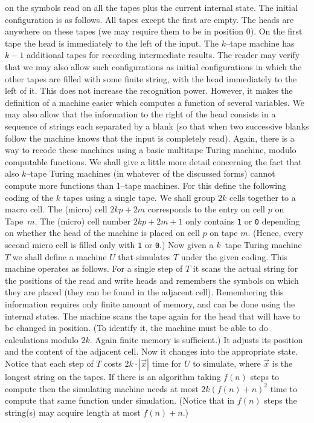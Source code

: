 on the symbols read on all the tapes plus the current internal
state. The initial configuration is as follows. All tapes
except the first are empty. The heads are anywhere on these
tapes (we may require them to be in position 0). On the first
tape the head is immediately to the left of the input.
The $k$--tape machine has $k-1$ additional tapes for
recording intermediate results. The reader may verify that we
may also allow such configurations as initial configurations
in which the other tapes are filled with some finite string,
with the head immediately to the left of it. This does not
increase the recognition power. However, it makes the definition
of a machine easier which computes a function of several 
variables. We may also allow that the information to the right of the
head consists in a sequence of strings each separated by
a blank (so that when two successive blanks follow the machine 
knows that the input is completely read). Again, there is a
way to recode these machines using a basic multitape Turing
machine, modulo computable functions. We shall give a little
more detail concerning the fact that also $k$--tape Turing
machines (in whatever of the discussed forms) cannot compute
more functions than 1--tape machines. For this define the
following coding of the $k$ tapes using a single tape.
We shall group $2k$ cells together to a macro cell.
The (micro) cell $2kp + 2m$ corresponds to the entry on
cell $p$ on Tape~$m$. The (micro) cell number $2kp + 2m +1$
only contains {\tt 1} or {\tt 0} depending on whether the head 
of the machine is placed on cell $p$ on tape $m$. (Hence, every 
second micro cell is filled only with {\tt 1} or {\tt 0}.)
Now given a $k$--tape Turing machine $T$ we shall define a
machine $U$ that simulates $T$ under the given coding.
This machine operates as follows. For a single step of $T$
it scans the actual string for the positions of the read and
write heads and remembers the symbols on which they are
placed (they can be found in the adjacent cell). Remembering
this information requires only finite amount of memory, and
can be done using the internal states. The machine scans the
tape again for the head that will have to be changed in position. 
(To identify it, the machine must be able to do calculations 
modulo $2k$. Again finite memory is sufficient.) It adjusts its 
position and the content of the adjacent cell. Now it changes
into the appropriate state. Notice that each step of $T$
costs $2k \cdot |\vec{x}|$ time for $U$ to simulate, where
$\vec{x}$ is the longest string on the tapes. If there is
an algorithm taking $f(n)$ steps to compute then the
simulating machine needs at most $2k(f(n)+n)^2$ time to
compute that same function under simulation. (Notice
that in $f(n)$ steps the string(s) may acquire length at most
$f(n) + n$.)

